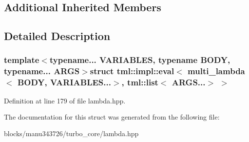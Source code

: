 \subsection*{Additional Inherited Members}


\subsection{Detailed Description}
\subsubsection*{template$<$typename... V\+A\+R\+I\+A\+B\+L\+E\+S, typename B\+O\+D\+Y, typename... A\+R\+G\+S$>$struct tml\+::impl\+::eval$<$ multi\+\_\+lambda$<$ B\+O\+D\+Y, V\+A\+R\+I\+A\+B\+L\+E\+S...$>$, tml\+::list$<$ A\+R\+G\+S...$>$ $>$}



Definition at line 179 of file lambda.\+hpp.



The documentation for this struct was generated from the following file\+:\begin{DoxyCompactItemize}
\item 
blocks/manu343726/turbo\+\_\+core/lambda.\+hpp\end{DoxyCompactItemize}
